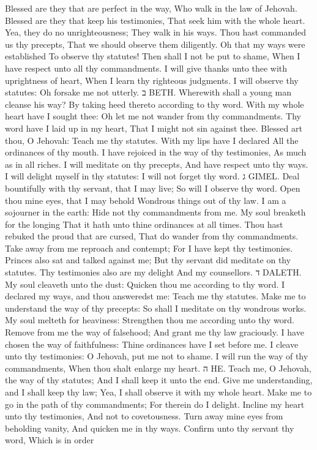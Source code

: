 Blessed are they that are perfect in the way, Who walk in the law of Jehovah.  Blessed are they that keep his testimonies, That seek him with the whole heart.  Yea, they do no unrighteousness; They walk in his ways.  Thou hast commanded us thy precepts, That we should observe them diligently.  Oh that my ways were established To observe thy statutes!  Then shall I not be put to shame, When I have respect unto all thy commandments.  I will give thanks unto thee with uprightness of heart, When I learn thy righteous judgments.  I will observe thy statutes: Oh forsake me not utterly. ב BETH.  Wherewith shall a young man cleanse his way? By taking heed thereto according to thy word.  With my whole heart have I sought thee: Oh let me not wander from thy commandments.  Thy word have I laid up in my heart, That I might not sin against thee.  Blessed art thou, O Jehovah: Teach me thy statutes.  With my lips have I declared All the ordinances of thy mouth.  I have rejoiced in the way of thy testimonies, As much as in all riches.  I will meditate on thy precepts, And have respect unto thy ways.  I will delight myself in thy statutes: I will not forget thy word. ג GIMEL.  Deal bountifully with thy servant, that I may live; So will I observe thy word.  Open thou mine eyes, that I may behold Wondrous things out of thy law.  I am a sojourner in the earth: Hide not thy commandments from me.  My soul breaketh for the longing That it hath unto thine ordinances at all times.  Thou hast rebuked the proud that are cursed, That do wander from thy commandments.  Take away from me reproach and contempt; For I have kept thy testimonies.  Princes also sat and talked against me; But thy servant did meditate on thy statutes.  Thy testimonies also are my delight And my counsellors. ד DALETH.  My soul cleaveth unto the dust: Quicken thou me according to thy word.  I declared my ways, and thou answeredst me: Teach me thy statutes.  Make me to understand the way of thy precepts: So shall I meditate on thy wondrous works.  My soul melteth for heaviness: Strengthen thou me according unto thy word.  Remove from me the way of falsehood; And grant me thy law graciously.  I have chosen the way of faithfulness: Thine ordinances have I set before me.  I cleave unto thy testimonies: O Jehovah, put me not to shame.  I will run the way of thy commandments, When thou shalt enlarge my heart. ה HE.  Teach me, O Jehovah, the way of thy statutes; And I shall keep it unto the end.  Give me understanding, and I shall keep thy law; Yea, I shall observe it with my whole heart.  Make me to go in the path of thy commandments; For therein do I delight.  Incline my heart unto thy testimonies, And not to covetousness.  Turn away mine eyes from beholding vanity, And quicken me in thy ways.  Confirm unto thy servant thy word, Which is in order 